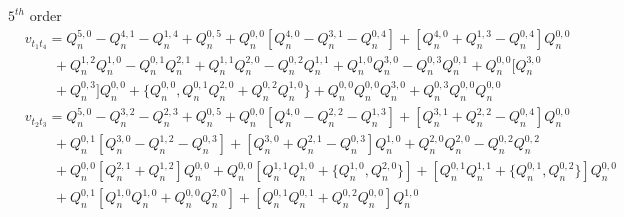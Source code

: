 \documentclass[11p,reqno]{amsart}
\numberwithin{equation}{section}
\numberwithin{equation}{section}
\begin{document}
$5^{th}$ order
\begin{align*}
    &v_{t_1t_4} = Q_n^{5, 0} - Q_n^{4, 1} - Q_n^{1, 4} + Q_n^{0, 5} + Q_n^{0, 0}[Q_n^{4, 0} - Q_n^{3, 1} - Q_n^{0, 4}] + [Q_n^{4, 0} + Q_n^{1, 3} - Q_n^{0, 4}]Q_n^{0, 0} \\
    & \qquad + Q_n^{1, 2}Q_n^{1, 0} - Q_n^{0, 1}Q_n^{2, 1} + Q_n^{1, 1}Q_n^{2, 0} - Q_n^{0, 2}Q_n^{1, 1} + Q_n^{1, 0}Q_n^{3, 0} - Q_n^{0, 3}Q_n^{0, 1} + Q_n^{0, 0}[Q_n^{3, 0} \\ 
    & \qquad + Q_n^{0, 3}]Q_n^{0, 0} + \{Q_n^{0, 0}, Q_n^{0, 1}Q_n^{2, 0} + Q_n^{0, 2}Q_n^{1, 0}\} + Q_n^{0, 0}Q_n^{0, 0}Q_n^{3, 0} + Q_n^{0, 3}Q_n^{0, 0}Q_n^{0, 0}\\
    &v_{t_2t_3} = Q_n^{5, 0} - Q_n^{3, 2} - Q_n^{2, 3} + Q_n^{0, 5} + Q_n^{0, 0}[Q_n^{4, 0} - Q_n^{2, 2} - Q_n^{1, 3}] + [Q_n^{3, 1} + Q_n^{2, 2} - Q_n^{0, 4}]Q_n^{0, 0} \\
    & \qquad + Q_n^{0, 1}[Q_n^{3, 0} - Q_n^{1, 2} - Q_n^{0, 3}] + [Q_n^{3, 0} + Q_n^{2, 1} - Q_n^{0, 3}]Q_n^{1, 0} + Q_n^{2, 0}Q_n^{2, 0} - Q_n^{0, 2}Q_n^{0, 2} \\ 
    & \qquad + Q_n^{0, 0}[Q_n^{2, 1} + Q_n^{1, 2}]Q_n^{0, 0} + Q_n^{0, 0}[Q_n^{1, 1}Q_n^{1, 0} + \{Q_n^{1, 0}, Q_n^{2, 0}\}] + [Q_n^{0, 1}Q_n^{1, 1} + \{Q_n^{0, 1}, Q_n^{0, 2}\}]Q_n^{0, 0} \\ 
    & \qquad + Q_n^{0, 1}[Q_n^{1, 0}Q_n^{1, 0} + Q_n^{0, 0}Q_n^{2, 0}] + [Q_n^{0, 1}Q_n^{0, 1} + Q_n^{0, 2}Q_n^{0, 0}]Q_n^{1, 0}
\end{align*}
\end{document}
